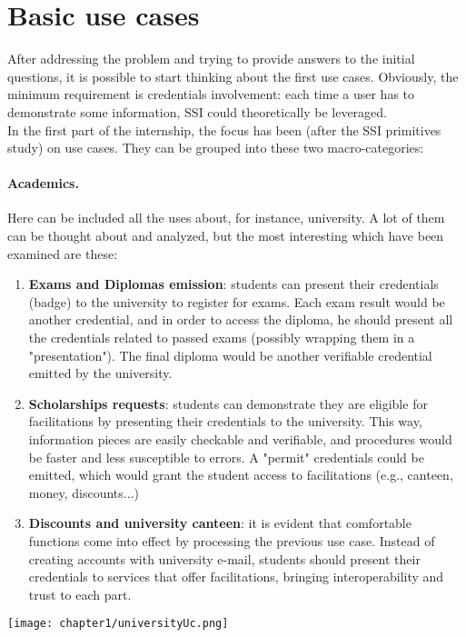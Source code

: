 \section{Basic use cases}
After addressing the problem and trying to provide answers to the initial 
questions, it is possible to start thinking about the first use cases.
Obviously, the minimum requirement is credentials involvement: each time a user 
has to demonstrate some information, SSI could theoretically be leveraged.
\vspace*{0.3cm}\\
In the first part of the internship, the focus has been (after the SSI primitives 
study) on use cases. They can be grouped into these two macro-categories:
\paragraph{Academics.}
Here can be included all the uses about, for instance, university. A lot of them 
can be thought about and analyzed, but the most interesting which have been examined 
are these:
\begin{enumerate}
    \item \textbf{Exams and Diplomas emission}: students can present 
    their credentials (badge) to the university to register for exams. 
    Each exam result would be another credential, and in order to access the 
    diploma, he should present all the credentials related to passed exams 
    (possibly wrapping them in a "presentation"). The final diploma would 
    be another verifiable credential emitted by the university.
    \item \textbf{Scholarships requests}: students can demonstrate they are 
    eligible for facilitations by presenting their credentials to the university. 
    This way, information pieces are easily checkable and verifiable, and procedures 
    would be faster and less susceptible to errors. A "permit" credentials could be 
    emitted, which would grant the student access to facilitations (e.g., canteen,  
    money, discounts...)
    \item \textbf{Discounts and university canteen}: it is evident that comfortable
    functions come into effect by processing the previous use case. Instead of 
    creating accounts with university e-mail, students should present their 
    credentials to services that offer facilitations, bringing interoperability 
    and trust to each part.
\end{enumerate}
\begin{center}
    \texttt{[image: chapter1/universityUc.png]}
\end{center}
    

